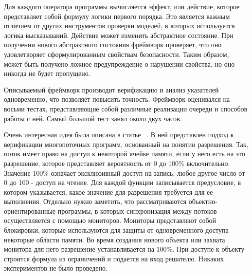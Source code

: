 Для каждого оператора программы вычисляется эффект, или действие, которое представляет собой формулу логики первого порядка.
Это является важным отличием от других инструментов проверки моделей, в которых используется логика высказываний.
Действие может изменить абстрактное состояние. При получении нового абстрактного состояния фреймворк проверяет, что оно удовлетворяет сформулированным свойствам безопасности. 
Таким образом, может быть получено ложное предупреждение о нарушении свойства, но оно никогда не будет пропущено.

Описываемый фреймворк производит верификацию и анализ указателей одновременно, что позволяет повысить точность.
Фреймворк оценивался на восьми тестах, представляющие собой различные реализации очереди и способов работы с ней.
Самый большой тест занял около двух часов.


Очень интересная идея была описана в статье ~\cite{Leino:2009}. В ней представлен подход к верификации многопоточных программ, основанный на понятии разрешения.
Так, поток имеет право на доступ к некоторой ячейке памяти, если у него есть на это разрешение, которое представляет вероятность от 0 до 100\% включительно.
Значение 100\% означает эксклюзивный доступ на запись, любое другое число от 0 до 100 - доступ на чтение.
Для каждой функции записывается предусловие, в котором указывается, какое значение для разрешения требуется для ее выполнения.
Отдельно нужно заметить, что рассматриваются объектно-ориентированные программы, в которых синхронизация между потоков осуществляется с помощью мониторов.
Мониторы представляют собой блокировки, которые используются для защиты от одновременного доступа некоторые области памяти.
Во время создания нового объекта или захвата монитора для него разрешение устанавливается на 100\%.
При доступе к объекту строится формула из ограничений и подается на вход решателю.
Никаких экспериментов не было проведено.

